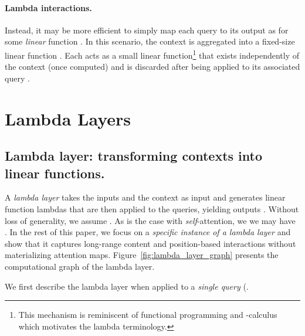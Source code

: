 \documentclass{article} \usepackage{iclr2021_conference,times}
\begin{document}
\vspace{-0.1cm}
\paragraph{Lambda interactions.}
Instead, it may be more efficient to simply map each query to its output as  for some \emph{linear} function .
In this scenario, the context is aggregated into a fixed-size linear function .
Each  acts as a small linear function\footnote{
This mechanism is reminiscent of functional programming and -calculus which motivates the lambda terminology.} that exists independently of the context (once computed) and is discarded after being applied to its associated query . \section{Lambda Layers\label{sec:lambda_layer}}

\subsection{Lambda layer: transforming contexts into linear functions.}
A \emph{lambda layer} takes the inputs  and the context  as input and generates linear function lambdas that are then applied to the queries, yielding outputs .
Without loss of generality, we assume .
As is the case with \emph{self}-attention, we we may have .
In the rest of this paper, we focus on a \emph{specific instance of a lambda layer} and show that it captures long-range content and position-based interactions without materializing attention maps.
Figure~\ref{fig:lambda_layer_graph} presents the computational graph of the lambda layer.

We first describe the lambda layer when applied to a \emph{single query} (.

\vspace{-0.1cm}
\end{document}

